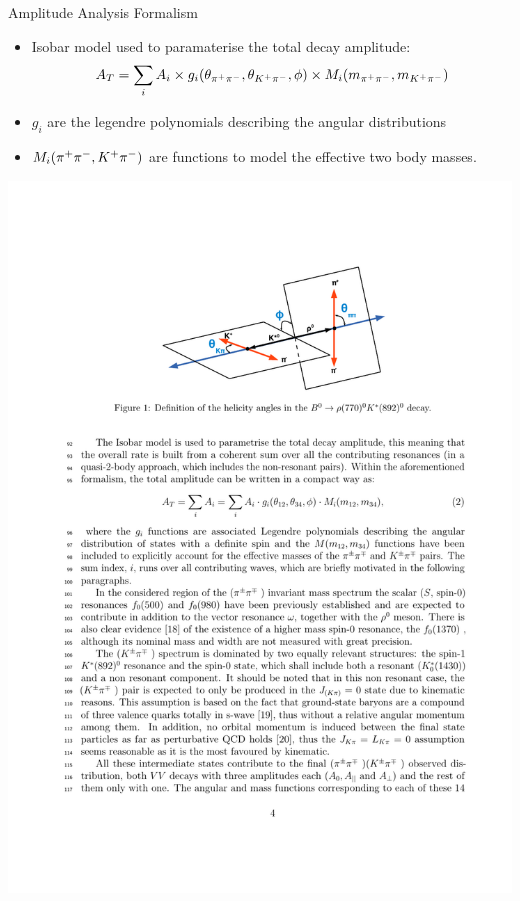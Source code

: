 \documentclass{beamer}
\begin{document}
\begin{frame}{Amplitude Analysis Formalism}
  \begin{itemize}
  \item Isobar model used to paramaterise the total \decay{\Bd}{(\pip\pim)(\Kp\pim)} decay amplitude:
    \begin{equation}
      A_{T}=\sum_i A_i \times g_i(\theta_{\pi^+\pi^-},\theta_{K^+\pi^-},\phi) \times M_i(m_{\pi^+\pi^-},m_{K^+\pi^-})
    \end{equation}
  \item $g_i$ are the legendre polynomials describing the angular distributions
  \item $M_i(\pi^+\pi^-,K^+\pi^-)$ are functions to model the effective two body masses.
  \end{itemize}
  \includegraphics[width=.5\textwidth]{KstarRhozAngles.pdf}
\end{frame}
\end{document}
